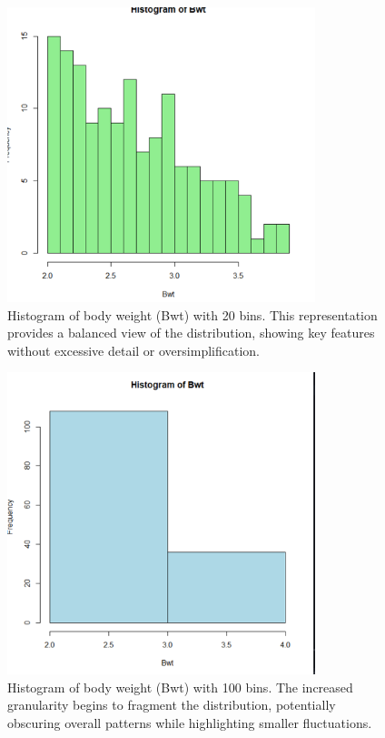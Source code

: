 \documentclass[a4paper,12pt]{article}
\begin{document}
\begin{figure}[H]
    \centering
    \includegraphics[width=0.8\textwidth]{hist20.png}
    \caption{Histogram of body weight (Bwt) with 20 bins. This representation provides a balanced view of the distribution, showing key features without excessive detail or oversimplification.}
    \label{fig:hist20}
\end{figure}

\begin{figure}[H]
    \centering
    \includegraphics[width=0.8\textwidth]{hist100.png}
    \caption{Histogram of body weight (Bwt) with 100 bins. The increased granularity begins to fragment the distribution, potentially obscuring overall patterns while highlighting smaller fluctuations.}
    \label{fig:hist100}
\end{figure}
\end{document}
